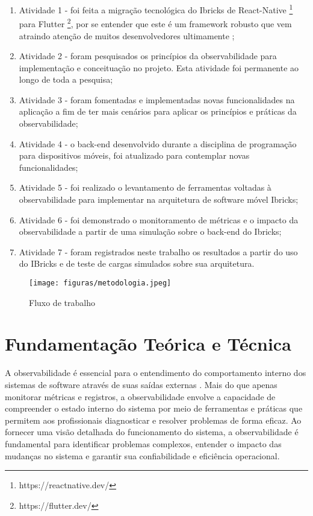 \documentclass[12pt]{article}
\begin{document}
\begin{enumerate}
    \item Atividade 1 - foi feita a migração tecnológica do Ibricks de React-Native  \footnote{https://reactnative.dev/} para Flutter \footnote{https://flutter.dev/}, por se entender que este é um framework robusto que vem atraindo atenção de muitos desenvolvedores ultimamente \cite{gulcuouglu2021comparison};
    \item Atividade 2 - foram pesquisados os princípios da observabilidade para implementação e conceituação no projeto. Esta atividade foi permanente ao longo de toda a pesquisa;
    \item Atividade 3 - foram fomentadas e implementadas novas funcionalidades na aplicação a fim de ter mais cenários para aplicar os princípios e práticas da observabilidade;
    \item Atividade 4 - o back-end desenvolvido durante a disciplina de programação para dispositivos móveis, foi atualizado para contemplar novas funcionalidades;
    \item Atividade 5 - foi realizado o levantamento de ferramentas voltadas à observabilidade para implementar na arquitetura de software móvel Ibricks;
    \item Atividade 6 - foi demonstrado o monitoramento de métricas e o impacto da observabilidade a partir de uma simulação sobre o back-end do Ibricks;
    \item Atividade 7 - foram registrados neste trabalho os resultados a partir do uso do IBricks e de teste de cargas simulados sobre sua arquitetura.
\end{enumerate}

\begin{figure}[!htb]
\centering
\texttt{[image: figuras/metodologia.jpeg]}
\caption{Fluxo de trabalho}
\label{fig:metodologia}
\end{figure}

\section{Fundamentação Teórica e Técnica}

A observabilidade é essencial para o entendimento do comportamento interno dos sistemas de software através de suas saídas externas \cite{majors2022observability}. Mais do que apenas monitorar métricas e registros, a observabilidade envolve a capacidade de compreender o estado interno do sistema por meio de ferramentas e práticas que permitem aos profissionais diagnosticar e resolver problemas de forma eficaz. Ao fornecer uma visão detalhada do funcionamento do sistema, a observabilidade é fundamental para identificar problemas complexos, entender o impacto das mudanças no sistema e garantir sua confiabilidade e eficiência operacional.
\end{document}
